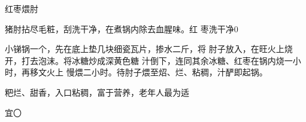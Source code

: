 \begin{recipe}{红枣煨肘}

\ingredients


\cooking

\step 猪肘拈尽毛粧，刮洗干净，在煮锅内除去血腥味。红 枣洗干净0

\step 小锑锅一个，先在底上垫几块细瓷瓦片，掺水二斤，将 肘子放入，在旺火上烧开，打去泡沫。将冰糖炒成深黄色糖 汁倒下，连同其余冰糖、红枣在锅内烧一小时，再移文火上 慢煨二小时。待肘子煨至炤、烂、粘稠，汁酽即起锅。

\notes

粑烂、甜香，入口粘稠，富于营养，老年人最为适

宜〇

\end{recipe}


